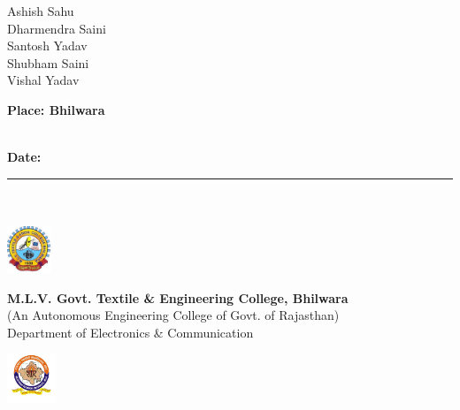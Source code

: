 \documentclass[twoside,a4paper,16pt]{book}
\begin{document}
{{			Ashish Sahu\\
			Dharmendra Saini\\
			Santosh Yadav\\
			Shubham Saini\\
			Vishal Yadav\\\vspace{2cm}
			
			{\bf Place: Bhilwara }\\\\
			{\bf Date: {\rule{20mm}{0.2mm}} } 
		}
		\newpage
		\noindent%
		\\
		\\
		\includegraphics[width=0.10\textwidth]{logo.jpg}%
		\begin{minipage}[b]{0.8\textwidth}
			\centering
			{\large {\bf M.L.V. Govt. Textile \& Engineering College, Bhilwara} }\\
			(An Autonomous Engineering College of Govt. of Rajasthan)\\
			Department of Electronics \& Communication
		\end{minipage}%
		\includegraphics[width=0.11\textwidth]{rtu.png}\\
		\\
		
}
\end{document}
